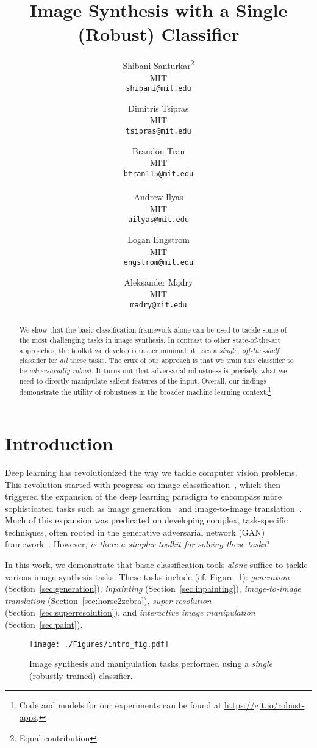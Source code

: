 \documentclass{article}
\title{Image Synthesis with a Single (Robust) Classifier}
\author{Shibani Santurkar\footnote{Equal contribution} \\
    MIT \\
  \texttt{shibani@mit.edu} \\
   \and
   Dimitris Tsipras\footnotemark[1] \\
    MIT \\
  \texttt{tsipras@mit.edu} \\
  \and 
  Brandon Tran\footnotemark[1] \hfill\null \\
    MIT \\
  \texttt{btran115@mit.edu} \\ \\
  \AND 
  Andrew Ilyas\footnotemark[1] \\
    MIT \\
  \texttt{ailyas@mit.edu} \\
  \and 
  Logan Engstrom\footnotemark[1]\\ 
    MIT \\
  \texttt{engstrom@mit.edu} \\
  \and 
  Aleksander M\k{a}dry \\
    MIT \\
  \texttt{madry@mit.edu}  
}
\date{}
\begin{document}
\maketitle
\vspace{-1em}
\begin{abstract}
We show that the basic classification framework alone can be used to
tackle some of the most challenging tasks in image synthesis.
In contrast to other state-of-the-art approaches, the
toolkit we develop is rather minimal: it uses a {\em single, off-the-shelf}
classifier for {\em all} these tasks.
The crux of our approach is that we train this classifier to be {\em adversarially robust}.
It turns out that adversarial robustness is precisely what we need
to directly manipulate salient features of the input.
Overall, our findings demonstrate the utility of robustness in the broader
machine learning context.\footnote{Code and models for our experiments can be
found at \url{https://git.io/robust-apps}.}
 \end{abstract}

\vspace{-1em}
\section{Introduction}
Deep learning has revolutionized the way we tackle computer vision problems.
This revolution started with progress on image
classification~\cite{krizhevsky2012imagenet,he2015delving,he2016deep},
which then triggered the expansion of the deep learning paradigm to encompass
more sophisticated tasks such as
image generation~\cite{karras2018progressive,brock2019large}
and image-to-image translation~\cite{isola2017image,zhu2017unpaired}.
Much of this expansion was predicated on developing complex,
task-specific techniques, often rooted in
the generative adversarial network (GAN) framework~\cite{goodfellow2014generative}.
However, {\em is there a simpler toolkit for solving these tasks}?

In this work, we demonstrate that basic classification tools {\em alone}
suffice to tackle various image synthesis tasks. These tasks include
(cf. Figure~\ref{fig:intro_fig}):
{\em generation} (Section~\ref{sec:generation}),
{\em inpainting} (Section~\ref{sec:inpainting}),
{\em image-to-image translation} (Section~\ref{sec:horse2zebra}),
{\em super-resolution} (Section~\ref{sec:superresolution}), and
{\em interactive image manipulation} (Section~\ref{sec:paint}).

\begin{figure}[!h]
	\centering
	\texttt{[image: ./Figures/intro\_fig.pdf]}
	\caption{Image synthesis and manipulation tasks performed using a \emph{single} 
					(robustly trained) classifier.}
	\label{fig:intro_fig}
\end{figure}
\end{document}
